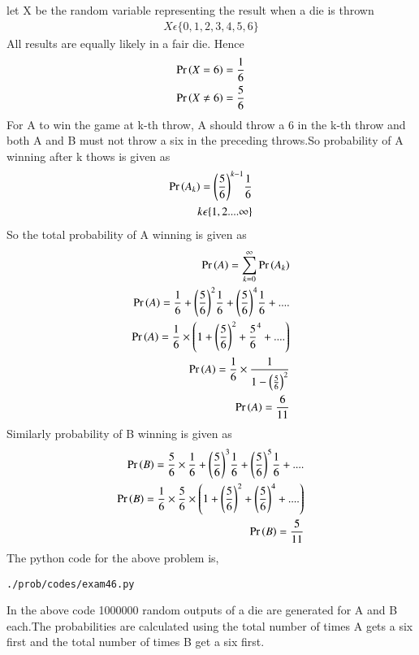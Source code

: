 let X be the random variable representing the result when a die is thrown
\begin{align}
X \epsilon \{0,1,2,3,4,5,6\}
\end{align}
All results are equally likely in a fair die. Hence 
\begin{align}
\Pr\left(X = 6\right) = \frac{1}{6}
\\
\Pr\left(X \neq 6\right) = \frac{5}{6}
\end{align}
For A to win the game at k-th throw, A should throw a 6 in the k-th throw and both A and B must not throw a six in the preceding  throws.So probability of A winning after k thows is given as
\begin{align}
\Pr\left(A_k\right)={\left(\frac{5}{6}\right)}^{k-1}\frac{1}{6}
\\
k \epsilon \{1,2....\infty\}
\end{align}
So the total probability of A winning is given as
\begin{align}
\Pr\left(A\right)=\sum_{k=0}^{\infty}\Pr\left(A_k\right)
\\
\Pr\left(A\right)=\frac{1}{6}+{\left(\frac{5}{6}\right)}^{2}\frac{1}{6}+{\left(\frac{5}{6}\right)}^{4}\frac{1}{6}+....
\\
\Pr\left(A\right)=\frac{1}{6}\times\left(1+{\left(\frac{5}{6}\right)}^{2}+{\frac{5}{6}}^{4}+....\right)
\\
\Pr\left(A\right)=\frac{1}{6}\times\frac{1}{1-{\left(\frac{5}{6}\right)}^2}
\\
\Pr\left(A\right)=\frac{6}{11}
\end{align}
Similarly probability of B winning is given as
\begin{align}
\Pr\left(B\right)=\frac{5}{6}\times\frac{1}{6}+{\left(\frac{5}{6}\right)}^{3}\frac{1}{6}+{\left(\frac{5}{6}\right)}^{5}\frac{1}{6}+....
\\
\Pr\left(B\right)=\frac{1}{6}\times\frac{5}{6}\times\left(1+{\left(\frac{5}{6}\right)}^{2}+{\left(\frac{5}{6}\right)}^{4}+....\right)
\\
\Pr\left(B\right)=\frac{5}{11}
\end{align}
The python code for the above problem is,
\begin{lstlisting}
./prob/codes/exam46.py
\end{lstlisting}
In the above code 1000000 random outputs of a die are generated for A and B each.The probabilities are calculated using the total number of times A gets a six first and the total number of times B get a six first.
